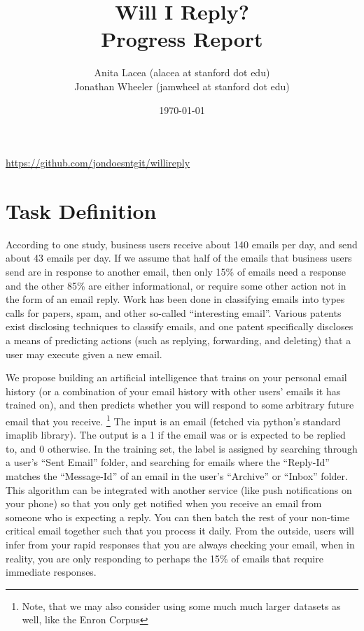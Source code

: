 \documentclass{article}
\title{Will I Reply?\\\Large Progress Report}
\author{Anita Lacea (alacea at stanford dot edu)\\Jonathan Wheeler (jamwheel at stanford dot edu)}
\date{\today}
\begin{document}
\maketitle
\vspace{-1cm}
\begin{center}
\href{https://github.com/jondoesntgit/willireply}{https://github.com/jondoesntgit/willireply}
\end{center}

\section{Task Definition}
According to one study, business users receive about 140 emails per day, and send about 43 emails per day.\cite{emailstatistics} If we assume that half of the emails that business users send are in response to another email, then only 15\% of emails need a response and the other 85\% are either informational, or require some other action not in the form of an email reply. Work has been done in classifying emails into types calls for papers\cite{learningrulesthatclassifyemail}, spam\cite{filteringjunkemail}, and other so-called ``interesting email''\cite{emailclassification}. Various patents exist disclosing techniques to classify emails\cite{Goodman:2014ug,Bellegarda:2010wk,Romero:2005vs}, and one patent specifically discloses a means of predicting actions (such as replying, forwarding, and deleting) that a user may execute given a new email\cite{Weber:2012tv}.

We propose building an artificial intelligence that trains on your personal email history (or a combination of your email history with other users' emails it has trained on), and then predicts whether you will respond to some arbitrary future email that you receive.
\footnote{Note, that we may also consider using some much much larger datasets as well, like the Enron Corpus\cite{enroncorpus}} The input is an email (fetched via python's standard imaplib library). 
The output is a 1 if the email was or is expected to be replied to, and 0 otherwise. 
In the training set, the label is assigned by searching through a user's ``Sent Email'' folder, and searching for emails where the ``Reply-Id'' matches the ``Message-Id'' of an email in the user's ``Archive'' or ``Inbox'' folder. 
This algorithm can be integrated with another service (like push notifications on your phone) so that you only get notified when you receive an email from someone who is expecting a reply. 
You can then batch the rest of your non-time critical email together such that you process it daily. 
From the outside, users will infer from your rapid responses that you are always checking your email, when in reality, you are only responding to perhaps the 15\% of emails that require immediate responses.
\end{document}
